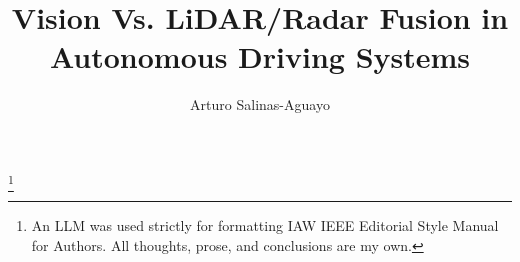 \documentclass[12pt]{article}
\title{\bfseries\LARGE Vision Vs. LiDAR/Radar Fusion in Autonomous Driving Systems}
\author{Arturo Salinas-Aguayo}
\begin{document}
\footnote{An LLM was used strictly for formatting IAW IEEE Editorial Style Manual
	for Authors. All thoughts, prose, and conclusions are
my own.}
\newpage
{}
\nocite{*}
\printbibliography
\end{document}
